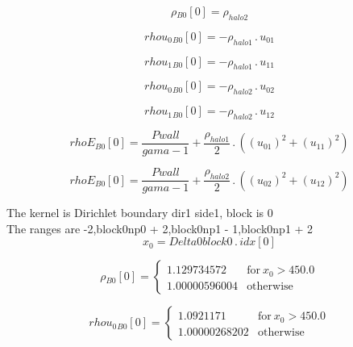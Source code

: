 \documentclass{article}
\begin{document}
\begin{dmath}{\rho{_{B0}}}[{0}] = \rho_{halo 2}\end{dmath}

\begin{dmath}{rhou_{0}{_{B0}}}[{0}] = - \rho_{halo 1} \,.\, u_{01}\end{dmath}

\begin{dmath}{rhou_{1}{_{B0}}}[{0}] = - \rho_{halo 1} \,.\, u_{11}\end{dmath}

\begin{dmath}{rhou_{0}{_{B0}}}[{0}] = - \rho_{halo 2} \,.\, u_{02}\end{dmath}

\begin{dmath}{rhou_{1}{_{B0}}}[{0}] = - \rho_{halo 2} \,.\, u_{12}\end{dmath}

\begin{dmath}{rhoE{_{B0}}}[{0}] = \frac{Pwall}{gama - 1} + \frac{\rho_{halo 1}}{2} \,.\, \left(\left(u_{01} \right)^{2} + \left(u_{11} \right)^{2}\right)\end{dmath}

\begin{dmath}{rhoE{_{B0}}}[{0}] = \frac{Pwall}{gama - 1} + \frac{\rho_{halo 2}}{2} \,.\, \left(\left(u_{02} \right)^{2} + \left(u_{12} \right)^{2}\right)\end{dmath}

\noindent The kernel is Dirichlet boundary dir1 side1, block is 0\\\noindent The ranges are -2,block0np0 + 2,block0np1 - 1,block0np1 + 2\\\begin{dmath}x_{0} = Delta0block0 \,.\, {idx}[{0}]\end{dmath}

\begin{dmath}{\rho{_{B0}}}[{0}] = \begin{cases} 1.129734572 & \text{for}\: x_{0} > 450.0 \\1.00000596004 & \text{otherwise} \end{cases}\end{dmath}

\begin{dmath}{rhou_{0}{_{B0}}}[{0}] = \begin{cases} 1.0921171 & \text{for}\: x_{0} > 450.0 \\1.00000268202 & \text{otherwise} \end{cases}\end{dmath}
\end{document}
